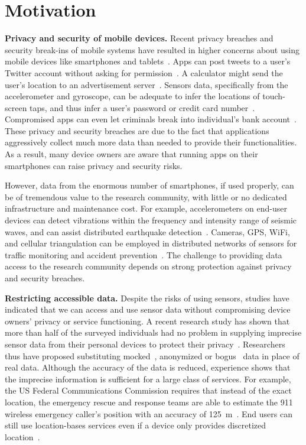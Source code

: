\section{Motivation}\label{sec-motivation}

\textbf{Privacy and security of mobile devices.}
Recent privacy breaches and security break-ins of mobile systems 
have resulted in higher concerns about using mobile devices like 
smartphones and tablets~\cite{breach}. Apps can post tweets to a 
user's Twitter account without asking for permission~\cite{tweet}. 
A calculator might send the user's location to an advertisement 
server~\cite{calc}. Sensors data, specifically from the accelerometer 
and gyroscope, can be adequate to infer the locations of touch-screen 
taps, and thus infer a user's password or credit card number~\cite{cai2011touchlogger, 
miluzzo2012tapprints, owusu2012accessory}.
Compromised apps can even let criminals break into individual's 
bank account~\cite{starbucks}. These privacy and security breaches 
are due to the fact that applications aggressively collect much more 
data than needed to provide their functionalities.
As a result, many device owners 
are aware that running apps on their smartphones can raise privacy 
and security risks. 

However, data from the enormous number of smartphones, 
if used properly, can be of tremendous value to the research 
community, with little or no dedicated infrastructure and maintenance 
cost. For example, accelerometers on end-user devices can 
detect vibrations within the frequency and intensity range of 
seismic waves, and can assist distributed earthquake 
detection~\cite{faulkner2011next}. Cameras, GPS, WiFi, and 
cellular triangulation can be employed in distributed networks 
of sensors for traffic monitoring and accident 
prevention~\cite{mohan2008nericell, thiagarajan2009vtrack}. 
The challenge to providing data access to the research community
depends on strong protection against privacy and security breaches.

\textbf{Restricting accessible data.}
Despite the risks of using sensors, 
studies have indicated that we can access and use sensor data 
without compromising device owners' privacy or service functioning.
A recent research study has shown that more than half of the 
surveyed individuals had no problem in supplying imprecise 
sensor data from their personal devices to protect their 
privacy~\cite{fawaz2014location}. Researchers thus have proposed 
substituting mocked~\cite{beresford2011mockdroid}, anonymized 
or bogus~\cite{zhou2011taming} data in place of real data. Although
the accuracy of the data is reduced, experience shows
that the imprecise information is sufficient for a large class of 
services. For example, the US Federal Communications Commission requires 
that instead of the exact location, the emergency rescue and 
response teams are able to estimate the 911 wireless emergency 
caller's position with an accuracy of 125~m~\cite{gruteser2003anonymous, 
reed1998overview}. End users can still use location-bases services
even if a device only provides discretized location~\cite{amini2011cache,
krumm2007inference}.

